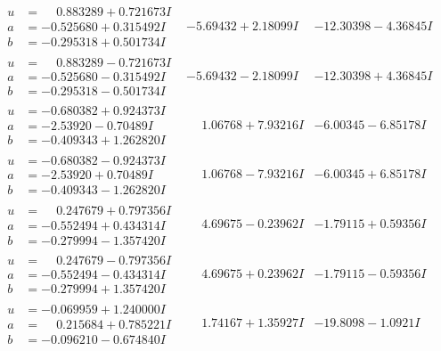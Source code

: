 \documentclass[1p]{elsarticle_modified}
\theoremstyle{definition}
\begin{document}
$$\begin{array}{c|c|c}
\begin{aligned}
u &= \phantom{-}0.883289 + 0.721673 I \\
a &= -0.525680 + 0.315492 I \\
b &= -0.295318 + 0.501734 I\end{aligned}
 & -5.69432 + 2.18099 I & -12.30398 - 4.36845 I \\ \hline\begin{aligned}
u &= \phantom{-}0.883289 - 0.721673 I \\
a &= -0.525680 - 0.315492 I \\
b &= -0.295318 - 0.501734 I\end{aligned}
 & -5.69432 - 2.18099 I & -12.30398 + 4.36845 I \\ \hline\begin{aligned}
u &= -0.680382 + 0.924373 I \\
a &= -2.53920 - 0.70489 I \\
b &= -0.409343 + 1.262820 I\end{aligned}
 & \phantom{-}1.06768 + 7.93216 I & -6.00345 - 6.85178 I \\ \hline\begin{aligned}
u &= -0.680382 - 0.924373 I \\
a &= -2.53920 + 0.70489 I \\
b &= -0.409343 - 1.262820 I\end{aligned}
 & \phantom{-}1.06768 - 7.93216 I & -6.00345 + 6.85178 I \\ \hline\begin{aligned}
u &= \phantom{-}0.247679 + 0.797356 I \\
a &= -0.552494 + 0.434314 I \\
b &= -0.279994 - 1.357420 I\end{aligned}
 & \phantom{-}4.69675 - 0.23962 I & -1.79115 + 0.59356 I \\ \hline\begin{aligned}
u &= \phantom{-}0.247679 - 0.797356 I \\
a &= -0.552494 - 0.434314 I \\
b &= -0.279994 + 1.357420 I\end{aligned}
 & \phantom{-}4.69675 + 0.23962 I & -1.79115 - 0.59356 I \\ \hline\begin{aligned}
u &= -0.069959 + 1.240000 I \\
a &= \phantom{-}0.215684 + 0.785221 I \\
b &= -0.096210 - 0.674840 I\end{aligned}
 & \phantom{-}1.74167 + 1.35927 I & -19.8098 - 1.0921 I \\ \hline\begin{aligned}

\end{aligned}
\end{array}$$
\end{document}
